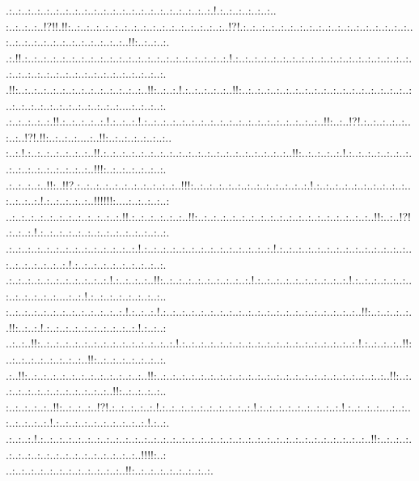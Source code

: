 \documentclass[paper=a4, fontsize=11pt]{scrartcl} %
\numberwithin{equation}{section} %
\numberwithin{figure}{section} %
\numberwithin{table}{section} %
\begin{document}
.:..:..:..:..:..:..:..:..:..:..:..:..:..:..:..:..:..:..:..:..:..:.!.:..:..:..:..:..:..\\:..:..:..:..!?!!.!!:..:..:..:..:..:..:..:..:..:..:..:..:..:..:..:..:..!?!.:..:..:..:..:..:..:..:..:..:..:..:..:..:..:..:..:..:..:..:..:..:..:..:..:..:..:..:..:..:..:..!!:..:..:..:.\\.:.!!.:..:..:..:..:..:..:..:..:..:..:..:..:..:..:..:..:..:..:..:..:..:.!.:..:..:..:..:..:..:..:..:..:..:..:..:..:..:..:..:..:..:..:..:..:..:..:..:..:..:..:..:..:..:..:..:..:..:..:.\\.!!:..:..:..:..:..:..:..:..:..:..:..:..:..:..!!:..:..:.!.:..:..:..:..:..!!:..:..:..:..:..:..:..:..:..:..:..:..:..:..:..:..:..:..:..:..:..:..:..:..:..:..:..:..:..:..:....:..:..:..:.\\.:..:..:..:..:.!!.:..:..:..:..:.!.:..:..:.!.:..:..:..:..:..:..:..:..:..:..:..:..:..:..:..:..:..:..:..!!:..:..!?!.:..:..:..:..:..:..:..!?!.!!:..:..:..:....:..!!:..:..:..:..:..:..:..\\:..:.!.:..:..:..:..:..:..:..!!.:..:..:..:..:..:..:..:..:..:..:..:..:..:..:..:..:..:..:..:..!!:..:..:..:..:.!.:..:..:..:..:..:..:..:..:..:..:..:..:..:..:..:..!!!:..:..:..:..:..:..:.\\.:..:..:..:..!!:..!!?.:..:..:..:..:..:..:..:..:..:..:..!!!:..:..:..:..:..:..:..:..:..:..:..:..:.!.:..:..:..:..:..:..:..:..:..:..:..:..:..:.!.:..:..:..:..:..!!!!!!:....:..:..:..:..:\\..:..:..:..:..:..:..:..:..:..:..:..:.!!.:..:..:..:..:..:..!!:..:..:..:..:..:..:..:..:..:..:..:..:..:..:..:..:..:..:..!!:..:..!?!.:..:..:.!.:..:..:..:..:..:..:..:..:..:..:..:..:..:.\\.:..:..:..:..:..:..:..:..:..:..:..:..:..:.!.:..:..:..:..:..:..:..:..:..:..:..:..:..:.!.:..:..:..:..:..:..:..:..:..:..:..:..:..:..:..:..:..:..:..:..:.!.:..:..:..:..:..:..:..:..:..:.\\.:..:..:..:..:..:..:..:..:..:..:.!.:..:..:..:..!!:..:..:..:..:..:..:..:..:..:.!.:..:..:..:..:..:..:..:..:..:.!.:..:..:..:..:..:..:..:..:..:..:..:....:..:.!.:..:..:..:..:..:..:..:..\\:..:..:..:..:..:..:..:..:..:..:..:..:.!.:..:..:.!.:..:..:..:..:..:..:..:..:..:..:..:..:..:..:..:..:..:..:..:..:..!!:..:..:..:..:..!!:..:..:.!.:..:..:..:..:..:..:..:..:..:.!.:..:..:\\..:..:..!!:..:..:..:..:..:..:..:..:..:..:..:..:..:..:.!.:..:..:..:..:..:..:..:..:..:..:..:..:..:..:..:..:..:..:.!.:..:..:..:..!!:..:..:..:..:..:..:..:..:..!!:..:..:..:..:..:..:..:.\\.:..!!:..:..:..:..:..:..:..:..:..:..:..:..:..!!:..:..:..:..:..:..:..:..:..:..:..:..:..:..:..:..:..:..:..:..:..:..:..:..:..!!:..:..:..:..:..:..:..:..:..:..:..:..:..!!:..:..:..:..:..\\:..:..:..:..:..!!:..:..:..:..!?!.:..:..:..:..:.!.:..:..:..:..:..:..:..:..:..:.!.:..:..:..:..:..:..:..:..:.!.:..:..:..:....:..:..:..:..:..:..:.!.:..:..:..:..:..:..:..:..:..:.!.:..:.\\.:..:..:.!.:..:..:..:..:..:..:..:..:..:..:..:..:..:..:..:..:..:..:..:..:..:..:..:..:..:..:..:..:..:..:..:..:..:..:..!!:..:..:..:..:..:..:..:..:..:..:..:..:..:..:..:..:..:..!!!!:..:\\..:..:..:..:..:..:..:..:..:..:..:..:..!!:..:..:..:..:..:..:..:..:.
\end{document}
